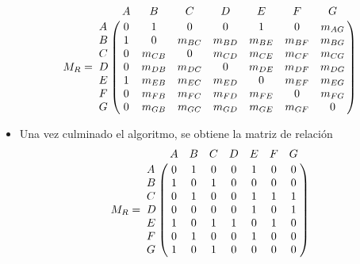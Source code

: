\documentclass[12pt]{article}
\begin{document}
\begin{itemize}
$$M_{R}=
\bordermatrix{
     &     A     &     B          &     C          &     D          &     E          &     F          &     G          \cr
A    &     0     &     1          &     0          &     0          &     1          &     0          &     m_{AG}     \cr
B    &     1     &     0          &     m_{BC}     &     m_{BD}     &     m_{BE}     &     m_{BF}     &     m_{BG}     \cr
C    &     0     &     m_{CB}     &     0          &     m_{CD}     &     m_{CE}     &     m_{CF}     &     m_{CG}     \cr
D    &     0     &     m_{DB}     &     m_{DC}     &     0          &     m_{DE}     &     m_{DF}     &     m_{DG}     \cr
E    &     1     &     m_{EB}     &     m_{EC}     &     m_{ED}     &     0          &     m_{EF}     &     m_{EG}     \cr
F    &     0     &     m_{FB}     &     m_{FC}     &     m_{FD}     &     m_{FE}     &     0          &     m_{FG}     \cr
G    &     0     &     m_{GB}     &     m_{GC}     &     m_{GD}     &     m_{GE}     &     m_{GF}     &     0     \cr
}
$$
\item Una vez culminado el algoritmo, se obtiene la matriz de relaci\'{o}n
$$M_{R}=
\bordermatrix{
 &A&B&C&D&E&F&G\cr
A&0&1&0&0&1&0&0\cr
B&1&0&1&0&0&0&0\cr
C&0&1&0&0&1&1&1\cr
D&0&0&0&0&1&0&1\cr
E&1&0&1&1&0&1&0\cr
F&0&1&0&0&1&0&0\cr
G&1&0&1&0&0&0&0\cr
}
$$
\end{itemize}
\end{document}

